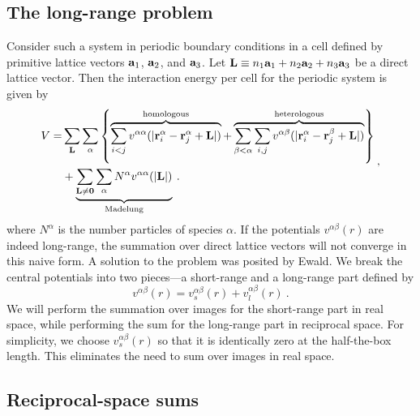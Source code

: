 \subsection{The long-range problem}
Consider such a system in periodic boundary conditions in a cell
defined by primitive lattice vectors $\mathbf{a}_1$, $\mathbf{a}_2$, and $\mathbf{a}_3$.
Let $\mathbf{L} \equiv n_1 \mathbf{a}_1 + n_2 \mathbf{a}_2 + n_3\mathbf{a}_3$ be a direct lattice
vector.  Then the interaction energy per cell for the periodic system
is given by
\begin{equation}
\begin{split}
V = & \sum_{\mathbf{L}} \sum_\alpha \left\{ 
\overbrace{\sum_{i<j} v^{\alpha\alpha}(|\mathbf{r}^\alpha_i - \mathbf{r}^\alpha_j + \mathbf{L}|)}^{\text{homologous}} +
\overbrace{\sum_{\beta<\alpha} 
\sum_{i,j} v^{\alpha \beta}(|\mathbf{r}^{\alpha}_i - \mathbf{r}^{\beta}_j+\mathbf{L}|)}^{\text{heterologous}}
\right\}  \\
& + \underbrace{\sum_{\mathbf{L} \neq \mathbf{0}} \sum_\alpha N^\alpha v^{\alpha \alpha} (|\mathbf{L}|)}_\text{Madelung}\:.
\end{split}
\label{eq:direct}\:,
\end{equation}
where $N^\alpha$ is the number particles of species $\alpha$.
If the potentials $v^{\alpha\beta}(r)$ are indeed long-range, the
summation over direct lattice vectors will not converge in this naive
form.  A solution to the problem was posited by Ewald.  We break the
central potentials into two pieces---a short-range and a long-range
part defined by
\begin{equation}
v^{\alpha \beta}(r) = v_s^{\alpha\beta}(r) + v_l^{\alpha \beta}(r)\:.
\end{equation}
We will perform the summation over images for the short-range part in
real space, while performing the sum for the long-range part in
reciprocal space.  For simplicity, we choose $v^{\alpha \beta}_s(r)$
so that it is identically zero at the half-the-box length.  This
eliminates the need to sum over images in real space.


\subsection{Reciprocal-space sums}
